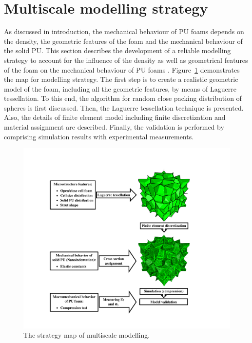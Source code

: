 \documentclass[review]{elsarticle}
\begin{document}
\section{Multiscale modelling strategy}
As discussed in introduction, the mechanical behaviour of PU foams depends on the density, the geometric features of the foam and the mechanical behaviour of the solid PU. This section describes the development of a reliable modelling strategy to account for the influence of the density as well as geometrical features of the foam on the mechanical behaviour of PU foams \citep{Chen2015150}. Figure~\ref{fig:Strategy} demonstrates the map for modelling strategy. The first step is to create a realistic geometric model of the foam, including all the geometric features, by means of Laguerre tessellation. To this end, the algorithm for random close packing distribution of spheres is first discussed. Then, the Laguerre tessellation technique is presented. Also, the details of finite element model including finite discretization and material assignment are described. Finally, the validation is performed by comprising simulation results with experimental measurements.
\begin{figure}[hb]
  \centering
  \includegraphics[scale=0.4]{Strategy}
  \captionsetup{justification=centering}
  \caption[Close up of \textit{Hemidactylus} sp.]
   {The strategy map of multiscale modelling.}
   \label{fig:Strategy}
\end{figure}
\end{document}
